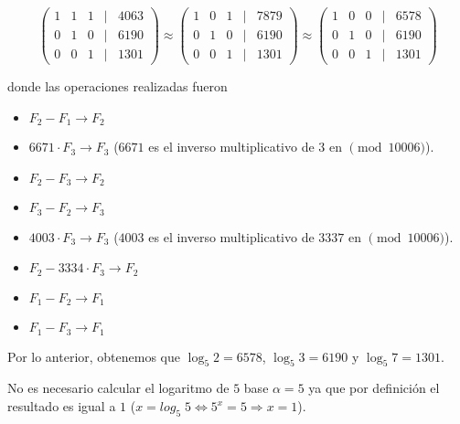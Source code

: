 \documentclass[letterpaper,11pt]{article}
\begin{document}
\begin{enumerate}
\begin{enumerate}
        \begin{equation*}
            \begin{pmatrix}
            1 & 1 & 1 & | & 4063\\
            0 & 1 & 0 & | & 6190\\
            0 & 0 & 1 & | & 1301
            \end{pmatrix}
            \approx
            \begin{pmatrix}
            1 & 0 & 1 & | & 7879\\
            0 & 1 & 0 & | & 6190\\
            0 & 0 & 1 & | & 1301
            \end{pmatrix}
            \approx
            \begin{pmatrix}
            1 & 0 & 0 & | & 6578\\
            0 & 1 & 0 & | & 6190\\
            0 & 0 & 1 & | & 1301
            \end{pmatrix}
        \end{equation*}
        
        donde las operaciones realizadas fueron
        \begin{itemize}
            \item $F_{2} - F_{1} \rightarrow F_{2}$
            \item $6671 \cdot F_{3} \rightarrow F_{3}$ ($6671$ es el inverso
            multiplicativo de $3$ en $\pmod{10006}$).
            \item $F_{2} - F_{3} \rightarrow F_{2}$
            \item $F_{3} - F_{2} \rightarrow F_{3}$
            \item $4003 \cdot F_{3} \rightarrow F_{3}$ ($4003$ es el inverso
            multiplicativo de $3337$ en $\pmod{10006}$).
            \item $F_{2} - 3334 \cdot F_{3} \rightarrow F_{2}$
            \item $F_{1} - F_{2} \rightarrow F_{1}$
            \item $F_{1} - F_{3} \rightarrow F_{1}$
        \end{itemize}
        
        Por lo anterior, obtenemos que $\log_{5} 2 = 6578$, $\log_{5} 3 = 6190$ 
        y $\log_{5} 7 = 1301$.
     
        No es necesario calcular el logaritmo de $5$ base $\alpha = 5$ ya que 
        por definición el resultado es igual a $1$ ($x = log_{5} \; 5 
        \Leftrightarrow 5^{x} = 5 \Rightarrow x = 1$).


\end{enumerate}
\end{enumerate}
\end{document}
